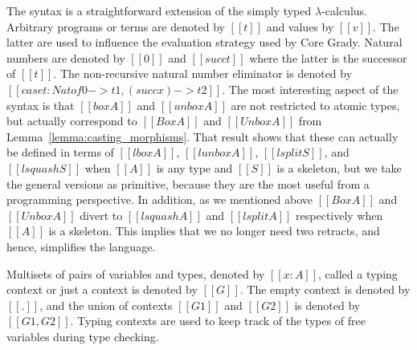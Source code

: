 The syntax is a straightforward extension of the simply typed
$\lambda$-calculus.  Arbitrary programs or terms are denoted by
$[[t]]$ and values by $[[v]]$. The latter are used to influence the
evaluation strategy used by Core Grady.  Natural numbers are denoted
by $[[0]]$ and $[[succ t]]$ where the latter is the successor of
$[[t]]$.  The non-recursive natural number eliminator is denoted by
$[[case t : Nat of 0 -> t1, (succ x) -> t2]]$.  The most interesting
aspect of the syntax is that $[[box A]]$ and $[[unbox A]]$ are not
restricted to atomic types, but actually correspond to $[[Box A]]$ and
$[[Unbox A]]$ from Lemma~\ref{lemma:casting_morphisms}.  That result
shows that these can actually be defined in terms of $[[lbox A]]$,
$[[lunbox A]]$, $[[lsplit S]]$, and $[[lsquash S]]$ when $[[A]]$ is
any type and $[[S]]$ is a skeleton, but we take the general versions
as primitive, because they are the most useful from a programming
perspective.  In addition, as we mentioned above $[[Box A]]$ and
$[[Unbox A]]$ divert to $[[lsquash A]]$ and $[[lsplit A]]$
respectively when $[[A]]$ is a skeleton.  This implies that we no
longer need two retracts, and hence, simplifies the language.

Multisets of pairs of variables and types, denoted by $[[x : A]]$,
called a typing context or just a context is denoted by $[[G]]$.  The
empty context is denoted by $[[.]]$, and the union of contexts
$[[G1]]$ and $[[G2]]$ is denoted by $[[G1,G2]]$.  Typing contexts are
used to keep track of the types of free variables during type
checking.

